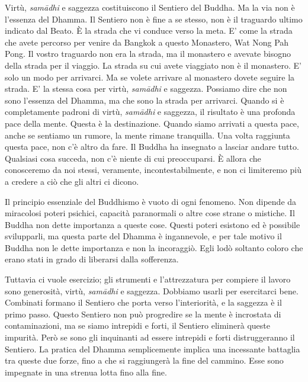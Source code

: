Virtù, \emph{samādhi} e saggezza costituiscono il Sentiero del Buddha. Ma la
via non è l'essenza del Dhamma. Il Sentiero non è fine a se stesso, non
è il traguardo ultimo indicato dal Beato. È la strada che vi conduce
verso la meta. E' come la strada che avete percorso per venire da
Bangkok a questo Monastero, Wat Nong Pah Pong. Il vostro traguardo non
era la strada, ma il monastero e avevate bisogno della strada per il
viaggio. La strada su cui avete viaggiato non è il monastero. E' solo un
modo per arrivarci. Ma se volete arrivare al monastero dovete seguire la
strada. E' la stessa cosa per virtù, \emph{samādhi} e saggezza. Possiamo dire
che non sono l'essenza del Dhamma, ma che sono la strada per arrivarci.
Quando si è completamente padroni di virtù, \emph{samādhi} e saggezza, il
risultato è una profonda pace della mente. Questa è la destinazione.
Quando siamo arrivati a questa pace, anche se sentiamo un rumore, la
mente rimane tranquilla. Una volta raggiunta questa pace, non c'è altro
da fare. Il Buddha ha insegnato a lasciar andare tutto. Qualsiasi cosa
succeda, non c'è niente di cui preoccuparsi. È allora che conosceremo da
noi stessi, veramente, incontestabilmente, e non ci limiteremo più a
credere a ciò che gli altri ci dicono.

Il principio essenziale del Buddhismo è vuoto di ogni fenomeno. Non
dipende da miracolosi poteri psichici, capacità paranormali o altre cose
strane o mistiche. Il Buddha non dette importanza a queste cose. Questi
poteri esistono ed è possibile svilupparli, ma questa parte del Dhamma è
ingannevole, e per tale motivo il Buddha non le dette importanza e non
la incoraggiò. Egli lodò soltanto coloro che erano stati in grado di
liberarsi dalla sofferenza.

Tuttavia ci vuole esercizio; gli strumenti e l'attrezzatura per compiere
il lavoro sono generosità, virtù, \emph{samādhi} e saggezza. Dobbiamo usarli
per esercitarci bene. Combinati formano il Sentiero che porta verso
l'interiorità, e la saggezza è il primo passo. Questo Sentiero non può
progredire se la mente è incrostata di contaminazioni, ma se siamo
intrepidi e forti, il Sentiero eliminerà queste impurità. Però se sono
gli inquinanti ad essere intrepidi e forti distruggeranno il Sentiero.
La pratica del Dhamma semplicemente implica una incessante battaglia tra
queste due forze, fino a che si raggiungerà la fine del cammino. Esse
sono impegnate in una strenua lotta fino alla fine.


